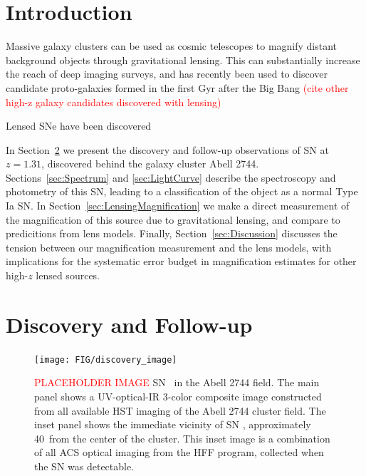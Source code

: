 
\section{Introduction}
\label{sec:Introduction}

Massive galaxy clusters can be used as cosmic telescopes to magnify
distant background objects through gravitational lensing.  This can
substantially increase the reach of deep imaging surveys, and has
recently been used to discover candidate proto-galaxies formed in the
first Gyr after the Big
Bang \citep{Zheng:2012,Coe:2013,} 
\textcolor{red}{(cite other high-z galaxy candidates discovered with lensing)}

Lensed SNe have been discovered
\citep{Goobar:2009,Riehm:2011,Patel:2014,Nordin:2014}

In Section~\ref{sec:DiscoveryAndFollowup} we present the discovery and
follow-up observations of SN \tomas at $z=1.31$, discovered behind the
galaxy cluster Abell 2744.  Sections~\ref{sec:Spectrum} and \ref{sec:LightCurve}
describe the spectroscopy and photometry of this SN, leading to a
classification of the object as a normal Type Ia SN.  In
Section~\ref{sec:LensingMagnification} we make a direct measurement of
the magnification of this source due to gravitational lensing, and
compare to predicitions from lens models.  Finally,
Section~\ref{sec:Discussion} discusses the tension between our
magnification measurement and the lens models, with implications for
the systematic error budget in magnification estimates for other
high-$z$ lensed sources.


\section{Discovery and Follow-up}
\label{sec:DiscoveryAndFollowup}

\begin{figure}
\begin{center}
\texttt{[image: FIG/discovery\_image]}
\caption{  
\textcolor{red}{PLACEHOLDER IMAGE}
SN \tomas\ in the Abell 2744 field.  The main panel shows a
UV-optical-IR 3-color composite image constructed from all available
HST imaging of the Abell 2744 cluster field.  The inset panel shows
the immediate vicinity of SN \tomas, approximately 40\arcsec\ from
the center of the cluster.  This inset image is 
a combination of all ACS optical imaging from the HFF program, collected
when the SN was detectable.}
\end{center}
\end{figure}



